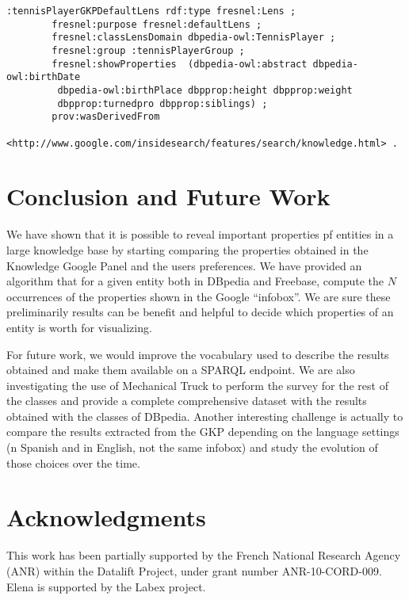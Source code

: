 \documentclass[runningheads,a4paper]{llncs}
\begin{document}
\begin{verbatim}
:tennisPlayerGKPDefaultLens rdf:type fresnel:Lens ;
		fresnel:purpose fresnel:defaultLens ;
		fresnel:classLensDomain dbpedia-owl:TennisPlayer ;
		fresnel:group :tennisPlayerGroup ;
		fresnel:showProperties  (dbpedia-owl:abstract dbpedia-owl:birthDate
		 dbpedia-owl:birthPlace dbpprop:height dbpprop:weight
		 dbpprop:turnedpro dbpprop:siblings) ;
		prov:wasDerivedFrom
		<http://www.google.com/insidesearch/features/search/knowledge.html> .		
\end{verbatim}	


\section{Conclusion and Future Work}
\label{sec:conclusion}
We have shown that it is possible to reveal important properties pf entities in a large knowledge base by starting comparing the properties obtained in the Knowledge Google Panel and the users preferences. We have provided an algorithm that for a given entity both in DBpedia and Freebase, compute the $N$ occurrences of the properties shown in the Google ``infobox''. We are sure these preliminarily results can be benefit and helpful to decide which properties of an entity is worth for visualizing.

For future work, we would improve the vocabulary used to describe the results obtained and make them available on a SPARQL endpoint. We are also investigating the use of Mechanical Truck to perform the survey for the rest of the classes and provide a complete comprehensive dataset with the results obtained with the classes of DBpedia. Another interesting challenge is actually to compare the results extracted from the GKP depending on the language settings (n Spanish and in English, not the same infobox) and study the evolution of those choices over the time. 



\section*{Acknowledgments} \label{sec:acknowledgments}
This work has been partially supported by the French National Research Agency (ANR) within the Datalift Project, under grant number ANR-10-CORD-009. Elena is supported by the Labex project.



\nocite{*}

\end{document}
